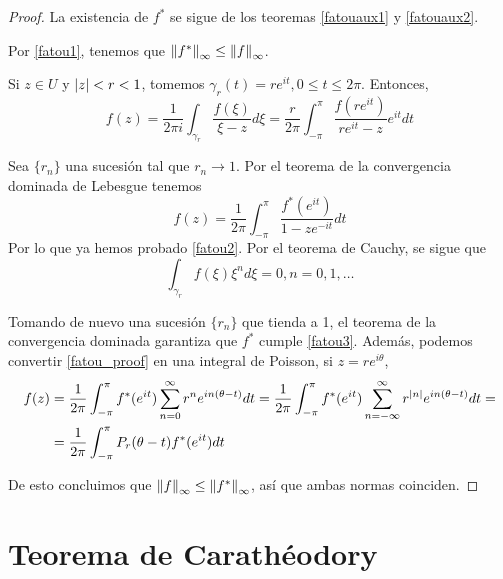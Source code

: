 \begin{proof}
    La existencia de $f^*$ se sigue de los teoremas \ref{fatouaux1} y \ref{fatouaux2}.

    Por \ref{fatou1}, tenemos que $\left\lVert f^*\right\rVert_{\infty} \leq \left\lVert f\right\rVert_{\infty}$.

    Si $z \in U$ y $\left\lvert z\right\rvert < r < 1$, tomemos $\gamma_r(t) = r e^{it}, 0 \leq t \leq 2\pi$. Entonces,
    \begin{equation*}
        f(z) = \dfrac{1}{2 \pi i} \int_{\gamma_r} \dfrac{f(\xi)}{\xi - z} d\xi =
        \dfrac{r}{2 \pi} \int_{-\pi}^{\pi} \dfrac{f(re^{it})}{re^{it} - z}e^{it} dt
    \end{equation*}

    Sea $\{r_n\}$ una sucesión tal que $r_n \rightarrow 1$. Por el teorema de la convergencia dominada de Lebesgue tenemos %
    \begin{equation}
        \label{fatou_proof}
        f(z) = \dfrac{1}{2 \pi} \int_{-\pi}^{\pi} \dfrac{f^* (e^{it})}{1 - ze^{-it}} dt
    \end{equation}
    Por lo que ya hemos probado \ref{fatou2}. Por el teorema de Cauchy, se sigue que
    \begin{equation*}
        \int_{\gamma_r} f(\xi)\xi^n d\xi = 0, n = 0, 1, \dots
    \end{equation*}

    Tomando de nuevo una sucesión $\{r_n\}$ que tienda a 1, el teorema de la convergencia dominada garantiza que $f^*$ cumple \ref{fatou3}. Además, podemos convertir \ref{fatou_proof} en una integral de Poisson, si $z = re^{i \theta}$,
    \begin{equation*}
         \begin{split}
             f(z) & = \dfrac{1}{2 \pi} \int_{- \pi}^{\pi} f^*(e^{it}) \sum_{n=0}^{\infty} r^n e^{in(\theta - t)} dt =  \dfrac{1}{2 \pi} \int_{- \pi}^{\pi} f^*(e^{it}) \sum_{n=-\infty}^{\infty} r^{\left\lvert n\right\rvert} e^{in(\theta - t)} dt = \\
                  & =  \dfrac{1}{2 \pi} \int_{- \pi}^{\pi} P_r(\theta - t) f^*(e^{it}) dt
         \end{split}
    \end{equation*}

    De esto concluimos que $\left\lVert f\right\rVert_{\infty} \leq \left\lVert f^*\right\rVert_{\infty}$, así que ambas normas coinciden.
\end{proof}

\section{Teorema de Carathéodory}

